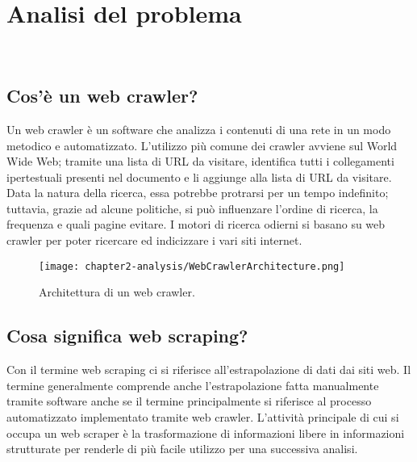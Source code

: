 
\chapter{Analisi del problema}
\label{cap:analisi-del-problema}

\\

\section{Cos'è un web crawler?}

Un web crawler è un software che analizza i contenuti di una rete in un modo metodico e automatizzato. L'utilizzo più comune dei crawler avviene sul World Wide Web; tramite una lista di URL da visitare, identifica tutti i collegamenti ipertestuali presenti nel documento e li aggiunge alla lista di URL da visitare. Data la natura della ricerca, essa potrebbe protrarsi per un tempo indefinito; tuttavia, grazie ad alcune politiche, si può influenzare l'ordine di ricerca, la frequenza e quali pagine evitare. I motori di ricerca odierni si basano su web crawler per poter ricercare ed indicizzare i vari siti internet.

\begin{figure}[!h] 
    \centering 
    \texttt{[image: chapter2-analysis/WebCrawlerArchitecture.png]} 
    \caption{Architettura di un web crawler.}
\end{figure}

\section{Cosa significa web scraping?}

Con il termine web scraping ci si riferisce all'estrapolazione di dati dai siti web. Il termine generalmente comprende anche l'estrapolazione fatta manualmente tramite software anche se il termine principalmente si riferisce al processo automatizzato implementato tramite web crawler. L'attività principale di cui si occupa un web scraper è la trasformazione di informazioni libere in informazioni strutturate per renderle di più facile utilizzo per una successiva analisi. 

